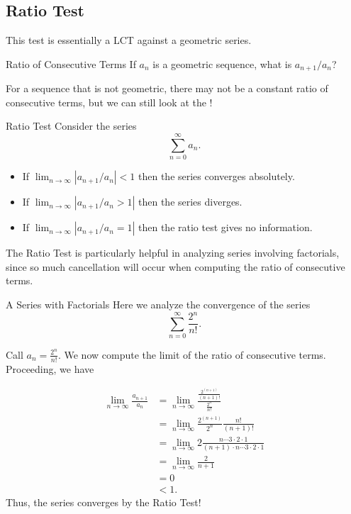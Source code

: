 \subsection{Ratio Test}

This test is essentially a LCT against a geometric series.

\begin{exercise}{Ratio of Consecutive Terms \Coffeecup}
If $a_n$ is a geometric sequence, what is $a_{n+1}/a_n$?
\vspace*{.5in}
\end{exercise}

For a sequence that is not geometric, there may not be a constant ratio of consecutive terms, but we can still look at the !

\begin{theorem}{Ratio Test}
Consider the series $$\sum_{n=0}^\infty a_n. $$
\begin{itemize}
\item If $\lim_{n\rightarrow \infty}\left\lvert a_{n+1}/a_n \right\rvert <1$ then the series converges absolutely.
\item If $\lim_{n\rightarrow \infty}\left\lvert a_{n+1}/a_n>1 \right\rvert$ then the series diverges.
\item If $\lim_{n\rightarrow \infty}\left\lvert a_{n+1}/a_n=1 \right\rvert$ then the ratio test gives no information.
\end{itemize}
\end{theorem}

The Ratio Test is particularly helpful in analyzing series involving factorials, since so much cancellation will occur when computing the ratio of consecutive terms.

\begin{example}{A Series with Factorials \Coffeecup \Coffeecup}
Here we analyze the convergence of the series $$\sum_{n=0}^\infty \frac{2^n}{n!}. $$

Call $a_n=\frac{2^n}{n!}$.  We now compute the limit of the ratio of consecutive terms.  Proceeding, we have

\begin{align*}
\lim_{n\rightarrow \infty} \frac{a_{n+1}}{a_n}&=\lim_{n\rightarrow \infty} \frac{\frac{2^{(n+1)}}{(n+1)!}}{\frac{2^n}{n!}}\\
&=\lim_{n\rightarrow \infty} \frac{2^{(n+1)}}{2^n}\frac{n!}{(n+1)!}\\
&=\lim_{n\rightarrow \infty} 2\frac{n\cdots 3 \cdot 2 \cdot 1 }{(n+1)\cdot n \cdots 3 \cdot 2 \cdot 1 } \\
&=\lim_{n\rightarrow \infty} \frac{2}{n+1}\\
&=0 \\
&<1.
\end{align*}
Thus, the series converges by the Ratio Test!  
\end{example}

